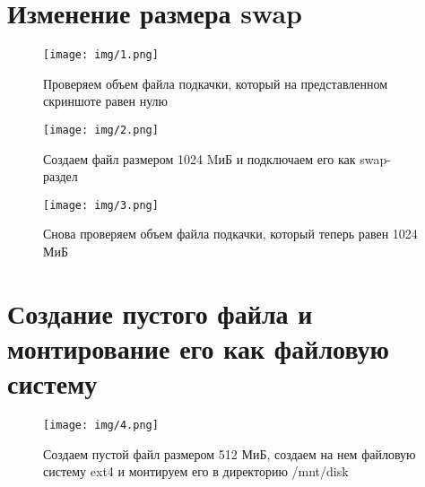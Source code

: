 \documentclass{gost}
\begin{document}
	\gostTitlePage

	\section{Изменение размера swap}
		\begin{figure}[H]
			\texttt{[image: img/1.png]}
			\caption{Проверяем объем файла подкачки, который на представленном
			скриншоте равен нулю}
		\end{figure}

		\begin{figure}[H]
			\texttt{[image: img/2.png]}
			\caption{Создаем файл размером 1024 MиБ и подключаем его как swap-раздел}
		\end{figure}

		\begin{figure}[H]
			\texttt{[image: img/3.png]}
			\caption{Снова проверяем объем файла подкачки, который теперь равен 1024
			МиБ}
		\end{figure}

	\section{Создание пустого файла и монтирование его как файловую систему}
		\begin{figure}[H]
			\texttt{[image: img/4.png]}
			\caption{Создаем пустой файл размером 512 МиБ, создаем на нем файловую
			систему ext4 и монтируем его в директорию /mnt/disk}
		\end{figure}
\end{document}
